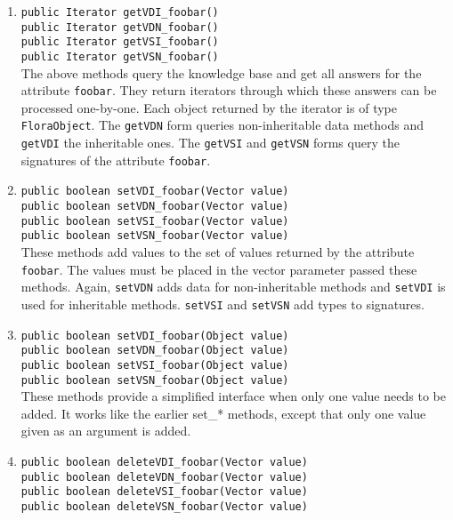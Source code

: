 \begin{enumerate}
\item {\tt public Iterator getVDI\_foobar()}\\
  {\tt public Iterator getVDN\_foobar()}
  \\
  {\tt public Iterator getVSI\_foobar()}\\
  {\tt public Iterator getVSN\_foobar()}
  \\
  The above methods query the knowledge base and get all answers for the
  attribute {\tt foobar}. They return iterators through which these answers
  can be processed one-by-one. Each object returned by the iterator is of
  type {\tt FloraObject}.  The {\tt getVDN} form queries non-inheritable
  data methods and {\tt getVDI} the inheritable ones. The {\tt getVSI} and
  {\tt getVSN} forms query the signatures of the attribute {\tt foobar}.
\item {\tt public boolean setVDI\_foobar(Vector value)}\\
  {\tt public boolean setVDN\_foobar(Vector value)}
  \\
  {\tt public boolean setVSI\_foobar(Vector value)}\\
  {\tt public boolean setVSN\_foobar(Vector value)}
  \\
  These methods
  add values to the set of values returned by the attribute {\tt foobar}. The
  values must be placed in the vector parameter passed these methods.
  Again, {\tt setVDN} adds data for non-inheritable methods and {\tt setVDI}
  is used for inheritable methods.
  {\tt setVSI} and {\tt setVSN} add types to signatures.  
\item {\tt public boolean setVDI\_foobar(Object value)}\\
  {\tt public boolean setVDN\_foobar(Object value)}
  \\
  {\tt public boolean setVSI\_foobar(Object value)}\\
  {\tt public boolean setVSN\_foobar(Object value)}\\
  These methods provide a simplified interface when only one value needs to
  be added.  It works like the earlier set\_* methods, except that only one
  value given as an argument is added.
\item {\tt public boolean deleteVDI\_foobar(Vector value)}\\
  {\tt public boolean deleteVDN\_foobar(Vector value)}
  \\
  {\tt public boolean deleteVSI\_foobar(Vector value)}\\
  {\tt public boolean deleteVSN\_foobar(Vector value)}

\end{enumerate}
